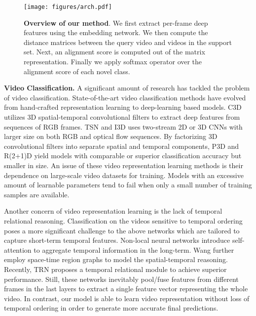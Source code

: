 \documentclass[10pt,twocolumn,letterpaper]{article}
\begin{document}
\begin{figure*}[t]
    \centering
    \texttt{[image: figures/arch.pdf]}
    \caption{\textbf{Overview of our method}. We first extract per-frame deep features using the embedding network. We then compute the distance matrices between the query video and videos in the support set. Next, an alignment score is computed out of the matrix representation. Finally we apply softmax operator over the alignment score of each novel class.} 
    \label{fig:pipeline}
\end{figure*}

\noindent \textbf{Video Classification.}
A significant amount of research has tackled the problem of video classification. State-of-the-art video classification methods have evolved from hand-crafted representation learning \cite{3dhog, sift3d, idt} to deep-learning based models. C3D \cite{tran2015learning} utilizes 3D spatial-temporal convolutional filters to extract deep features from sequences of RGB frames. TSN \cite{wang2016temporal} and I3D \cite{carreira2017quo} uses two-stream 2D or 3D CNNs with larger size on both RGB and optical flow sequences. By factorizing 3D convolutional filters into separate spatial and temporal components, P3D \cite{p3d} and R(2+1)D \cite{r2+1d} yield models with comparable or superior classification accuracy but smaller in size. An issue of these video representation learning methods is their dependence on large-scale video datasets for training. Models with an excessive amount of learnable parameters tend to fail when only a small number of training samples are available.

Another concern of video representation learning is the lack of temporal relational reasoning. Classification on the videos sensitive to temporal ordering poses a more significant challenge to the above networks which are tailored to capture short-term temporal features. Non-local neural networks \cite{wang2018non} introduce self-attention to aggregate temporal information in the long-term. Wang \etal \cite{wang2018videos} further employ space-time region graphs to model the spatial-temporal reasoning. Recently, TRN \cite{zhou2018temporal} proposes a temporal relational module to achieve superior performance. Still, these networks inevitably pool/fuse features from different frames in the last layers to extract a single feature vector representing the whole video. In contrast, our model is able to learn video representation without loss of temporal ordering in order to generate more accurate final predictions.
\end{document}
